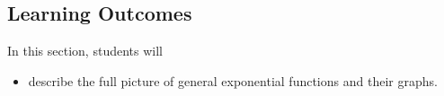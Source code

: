 \documentclass{ximera}
\begin{document}
\subsection{Learning Outcomes}


\begin{sectionOutcomes}
In this section, students will 

\begin{itemize}
\item describe the full picture of general exponential functions and their graphs.
\end{itemize}
\end{sectionOutcomes}
\end{document}
